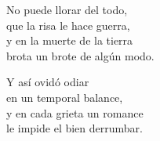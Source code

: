 \begin{lyrics}
No puede llorar del todo,\\
que la risa le hace guerra,\\
y en la muerte de la tierra\\
brota un brote de algún modo.

Y así ovidó odiar\\
en un temporal balance,\\
y en cada grieta un romance\\
le impide el bien derrumbar.
\end{lyrics}

